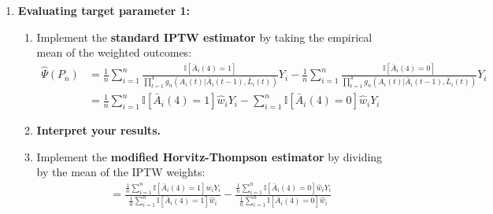 \documentclass[answers]{exam}
\begin{document}
\begin{enumerate}
\begin{enumerate}
\begin{enumerate}
\[\]
Look at the distribution of the weights by using the \texttt{hist()} and \texttt{summary()} functions. \textbf{Comment on the distribution of the weights.}
\item Create a logical variable that indicates which students had a treatment history $\bar{a}(4) = 1$. For example:
\begin{Schunk}
\begin{Sinput}
> I1111 = ObsData2$A1 == 1 & ObsData2$A2 == 1 & ObsData2$A3 == 1 & ObsData2$A4 == 1
\end{Sinput}
\end{Schunk}
Repeat for students who had treatment history $\bar{a}(4) = 0$.
\item Look at the distribution of the weights for students who had $\bar{a}(4) = 1$, and then $\bar{a}(4) = 0$. \textbf{Comment on the distributions. In particular, what does the distribution of the weights tell you here that the time-point specific conditional probabilities of treatment do not?}
\end{enumerate}
\item \textbf{Evaluating target parameter 1:}
\begin{enumerate}
\item Implement the \textbf{standard IPTW estimator} by taking the empirical mean of the weighted outcomes:
\begin{align*}
\hat{\Psi}(P_n) & =\frac{1}{n}\sum_{i=1}^n\frac{\mathbb{I}[\bar{A}_i(4)=1]}{\prod_{t=1}^4g_n(A_i(t)|\bar{A}_i(t-1), \bar{L}_i(t))}Y_i - \frac{1}{n}\sum_{i=1}^n\frac{\mathbb{I}[\bar{A}_i(4)=0]}{\prod_{t=1}^4g_n(A_i(t)|\bar{A}_i(t-1), \bar{L}_i(t))}Y_i \\
& =\frac{1}{n}\sum_{i=1}^n\mathbb{I}[\bar{A}_i(4)=1]\hat{w}_iY_i - \sum_{i=1}^n\mathbb{I}[\bar{A}_i(4)=0]\hat{w}_iY_i
\end{align*}
\item \textbf{Interpret your results.}
\item Implement the \textbf{modified Horvitz-Thompson estimator} by dividing by the mean of the IPTW weights:
\begin{align*}
& = \frac{\frac{1}{n}\sum_{i=1}^n\mathbb{I}[\bar{A}_i(4)=1]\hat{w}_iY_i}{\frac{1}{n}\sum_{i=1}^n\mathbb{I}[\bar{A}_i(4)=1]\hat{w}_i} - \frac{\frac{1}{n}\sum_{i=1}^n\mathbb{I}[\bar{A}_i(4)=0]\hat{w}_iY_i}{\frac{1}{n}\sum_{i=1}^n\mathbb{I}[\bar{A}_i(4)=0]\hat{w}_i}
\end{align*}


\end{enumerate}
\end{enumerate}
\end{enumerate}
\end{document}
